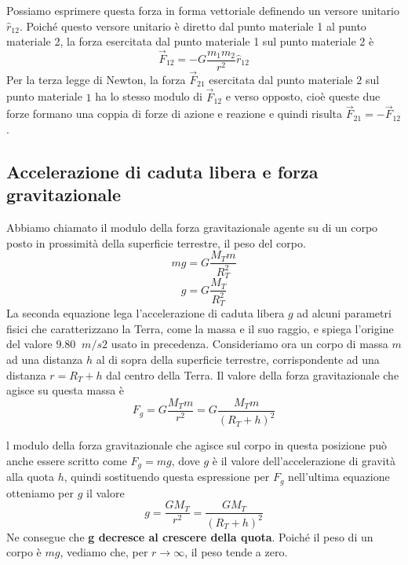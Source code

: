 \documentclass[a4paper,11pt,oneside]{book}
\begin{document}
Possiamo esprimere questa forza in forma vettoriale definendo un versore unitario $\hat{r}_{12}$. Poiché questo versore unitario è diretto dal punto materiale 1 al punto materiale 2, 
la forza esercitata dal punto materiale 1 sul punto materiale 2 è
\begin{equation*}
    \vec{F}_{12} = -G\frac{m_1m_2}{r^2}\hat{r}_{12}
\end{equation*}
Per la terza legge di Newton, la forza $\vec{F}_{21}$ esercitata dal punto materiale $2$ sul punto materiale $1$ ha lo stesso modulo di $\vec{F}_{12}$
e verso opposto, cioè queste due forze formano una coppia di forze di azione e reazione e quindi risulta $\vec{F}_{21} = -\vec{F}_{12}$ .

\subsection{Accelerazione di caduta libera e forza gravitazionale}
Abbiamo chiamato il modulo della forza gravitazionale agente su di un corpo posto in prossimità della superficie terrestre, il peso del corpo.
\begin{equation*}
    mg = G\frac{M_T m}{R_T^2}
\end{equation*}
\begin{equation*}
    g = G\frac{M_T}{R_T^2}
\end{equation*}
La seconda equazione lega l’accelerazione di caduta libera $g$ ad alcuni parametri fisici che caratterizzano la Terra, come la massa e il suo raggio,
e spiega l’origine del valore $9.80\;\;m/s2$ usato in precedenza.
Consideriamo ora un corpo di massa $m$ ad una distanza $h$ al di sopra della superficie terrestre, corrispondente ad una distanza $r=R_T+h$ dal centro 
della Terra. Il valore della forza gravitazionale che agisce su questa massa è
\begin{equation*}
    F_g = G\frac{M_T m}{r^2} = G\frac{M_T m}{(R_T + h)^2}
\end{equation*}

l modulo della forza gravitazionale che agisce sul corpo in questa posizione può anche essere scritto come $F_g = mg$, dove $g$ è il valore 
dell’accelerazione di gravità alla quota $h$, quindi sostituendo questa espressione per $F_g$ nell’ultima equazione otteniamo per $g$ il valore
\begin{equation*}
    g = \frac{GM_T}{r^2} = \frac{GM_T}{(R_T + h)^2}
\end{equation*}
Ne consegue che \textbf{g decresce al crescere della quota}.  Poiché il peso di un corpo è $mg$, vediamo che, per $r \to \infty$, il peso tende a zero.
\end{document}
